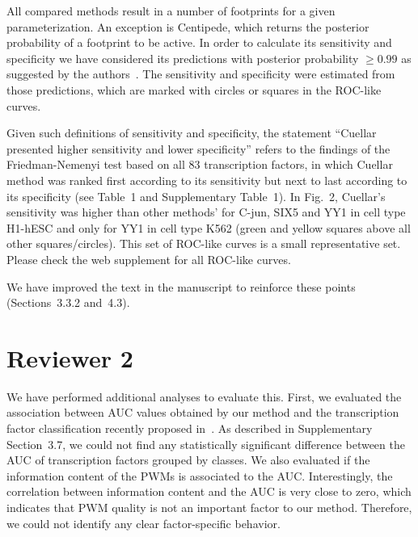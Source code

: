 \documentclass[11pt]{article}
\begin{document}
All compared methods result in a number of footprints for a given parameterization. An exception is Centipede, which returns the posterior probability of a footprint to be active. In order to calculate its sensitivity and specificity we have considered its predictions with posterior probability $\geq 0.99$ as suggested by the authors~\citep{pique2011}. The sensitivity and specificity were estimated from those predictions, which are marked with circles or squares in the ROC-like curves. 

Given such definitions of sensitivity and specificity, the statement ``Cuellar presented higher sensitivity and lower specificity'' refers to the findings of the Friedman-Nemenyi test based on all 83 transcription factors, in which Cuellar method was ranked first according to its sensitivity but next to last according to its specificity (see Table~1 and Supplementary Table~1). In Fig.~2, Cuellar's sensitivity was higher than other methods' for C-jun, SIX5 and YY1 in cell type H1-hESC and only for YY1 in cell type K562 (green and yellow squares above all other squares/circles). This set of ROC-like curves is a small representative set. Please check the web supplement for all ROC-like curves. 

We have improved the text in the manuscript to reinforce these points (Sections~3.3.2 and~4.3).



\section*{Reviewer 2}


We have performed additional analyses to evaluate this. First, we evaluated the association between AUC values obtained by our method and the transcription factor classification recently proposed in~\cite{wingender2013}. As described in Supplementary Section~3.7, we could not find any statistically significant difference between the AUC of transcription factors grouped by classes. We also evaluated if the information content of the PWMs is associated to the AUC. Interestingly, the correlation between information content and the AUC is very close to zero, which indicates that PWM quality is not an important factor to our method. Therefore, we could not identify any clear factor-specific behavior. 
\end{document}
